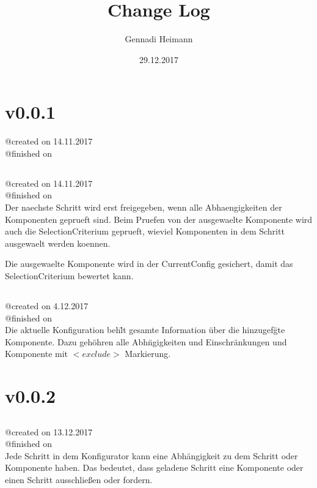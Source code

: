 \documentclass{article}
\begin{document}
\begin{titlepage}
\author{Gennadi Heimann} 
\title{Change Log} 
\date{29.12.2017} 
\maketitle
\end{titlepage}

\section{v0.0.1}
@created on 14.11.2017\\
@finished on \\

\subsection{}
@created on     14.11.2017\\
@finished on   \\

Der naechste Schritt wird erst freigegeben, wenn alle Abhaengigkeiten 
der Komponenten geprueft sind. Beim Pruefen von der ausgewaelte 
Komponente wird auch die SelectionCriterium geprueft, wieviel Komponenten 
in dem Schritt ausgewaelt werden koennen.

Die ausgewaelte Komponente wird in der CurrentConfig gesichert, damit das
SelectionCriterium bewertet kann.

\subsection{}
@created on     4.12.2017\\
@finished on   \\

Die aktuelle Konfiguration beh\"lt gesamte Information \"uber die hinzugef\"gte
Komponente. Dazu geh\"ohren alle Abh\"ngigkeiten und Einschr\"ankungen und
Komponente mit $<exclude>$ Markierung.


\section{v0.0.2}
\subsection{}
@created on 13.12.2017\\
@finished on \\
Jede Schritt in dem Konfigurator kann eine Abh\"angigkeit zu dem Schritt oder
Komponente haben. Das bedeutet, dass geladene Schritt eine Komponente oder einen
Schritt ausschlie\ss{}en oder fordern.\\
\end{document}
